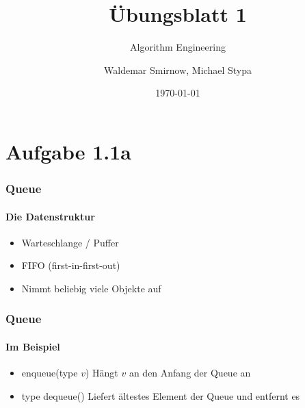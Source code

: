 \documentclass{beamer}
\title{Übungsblatt 1}
\subtitle{Algorithm Engineering}
\author{Waldemar Smirnow, Michael Stypa}
\institute{Universität Osnabrück}
\date{\today}
\begin{document}
\begin{frame}
    \titlepage
\end{frame}


\section{Aufgabe 1.1a}
\begin{frame}
  \frametitle{Queue}
  \framesubtitle{Die Datenstruktur}
  \begin{itemize}
    \item Warteschlange / Puffer
    \item FIFO (first-in-first-out)
    \item Nimmt beliebig viele Objekte auf
  \end{itemize}
\end{frame}

\begin{frame}
  \frametitle{Queue}
  \framesubtitle{Im Beispiel}
  \begin{figure}
    \centering
  \end{figure}
  \begin{itemize}
    \item<2-> enqueue(type $v$) Hängt $v$ an den Anfang der Queue an
    \item<3-> type dequeue() Liefert ältestes Element der Queue und entfernt es
  \end{itemize}
\end{frame}
\end{document}
